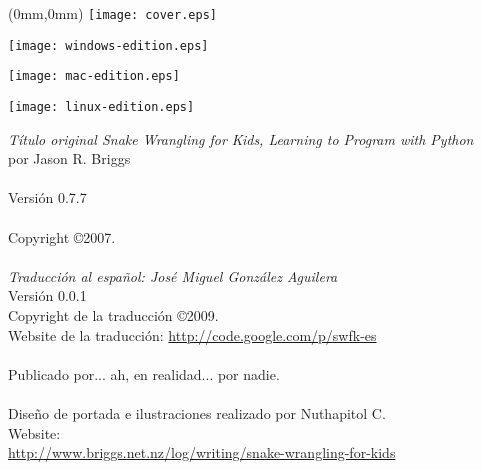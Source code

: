 \pagestyle{empty}
\frontmatter
\begin{FRONTCOVER}
\begin{titlepage}
\begin{textblock*}{210mm}(0mm,0mm)
   \texttt{[image: cover.eps]}
\end{textblock*}
\begin{flushleft}
\begin{WINDOWS}
\texttt{[image: windows-edition.eps]} 
\end{WINDOWS}
\begin{MAC}
\texttt{[image: mac-edition.eps]} 
\end{MAC}
\begin{LINUX}
\texttt{[image: linux-edition.eps]} 
\end{LINUX}
\end{flushleft}
\end{titlepage}
\end{FRONTCOVER}

\noindent
\textsf{\emph{Título original Snake Wrangling for Kids, Learning to Program with Python}}\\
por Jason R. Briggs\\
\\
Versión 0.7.7
\\\\
Copyright \copyright 2007.\\
\\
\textsf{\emph{Traducción al español: José Miguel González Aguilera}}\\
Versión 0.0.1\\
Copyright de la traducción \copyright 2009.\\
Website de la traducción: \href{http://code.google.com/p/swfk-es}{http://code.google.com/p/swfk-es}\\
\\
Publicado por... ah, en realidad... por nadie.\\
\\
Diseño de portada e ilustraciones realizado por Nuthapitol C.\\
\linebreak 
\noindent
Website:\\ \href{http://www.briggs.net.nz/log/writing/snake-wrangling-for-kids}{http://www.briggs.net.nz/log/writing/snake-wrangling-for-kids}\\ 

